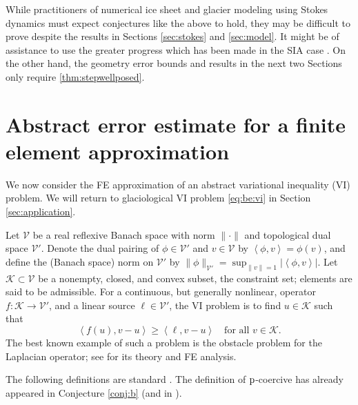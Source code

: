 \documentclass[hidelinks,onefignum,onetabnum,final]{siamart220329}  %
\newcommand{\cK}{\mathcal{K}}
\newcommand{\cV}{\mathcal{V}}
\newcommand{\pp}{{\text{\textnormal{p}}}}
\newcommand{\ip}[2]{\left<#1,#2\right>}
\begin{document}
While practitioners of numerical ice sheet and glacier modeling using Stokes dynamics must expect conjectures like the above to hold, they may be difficult to prove despite the results in Sections \ref{sec:stokes} and \ref{sec:model}.  It might be of assistance to use the greater progress which has been made in the SIA case \cite{Calvoetal2003,JouvetBueler2012,PiersantiTemam2023}.  On the other hand, the geometry error bounds and results in the next two Sections only require \ref{thm:stepwellposed}.


\section{Abstract error estimate for a finite element approximation} \label{sec:abstractestimate}

We now consider the FE approximation of an abstract variational inequality (VI) problem.  We will return to glaciological VI problem \eqref{eq:be:vi} in Section \ref{sec:application}.

Let $\cV$ be a real reflexive Banach space with norm $\|\cdot\|$ and topological dual space $\cV'$.  Denote the dual pairing of $\phi \in \cV'$ and $v\in\cV$ by $\ip{\phi}{v} = \phi(v)$, and define the (Banach space) norm on $\cV'$ by $\|\phi\|_{\cV'} = \sup_{\|v\|=1} |\!\ip{\phi}{v}\!|$.  Let $\cK \subset \cV$ be a nonempty, closed, and convex subset, the constraint set; elements are said to be admissible.  For a continuous, but generally nonlinear, operator $f:\cK \to \cV'$, and a linear source $\ell\in \cV'$, the VI problem is to find $u\in \cK$ such that
\begin{equation}
\ip{f(u)}{v-u} \ge \ip{\ell}{v-u} \quad \text{for all } v\in \cK. \label{eq:vi}
\end{equation}
The best known example of such a problem is the obstacle problem for the Laplacian operator; see \cite{Ciarlet2002,Evans2010,KinderlehrerStampacchia1980} for its theory and FE analysis.

The following definitions are standard \cite[Chapter III]{KinderlehrerStampacchia1980}.  The definition of $\pp$-coercive has already appeared in Conjecture \ref{conj:b} (and in \cite{Bueler2021conservation}).
\end{document}
